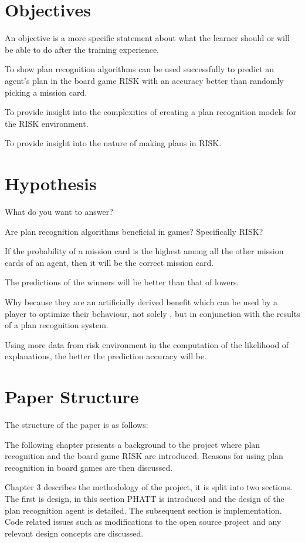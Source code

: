 \documentclass[parskip]{cs4rep}
\begin{document}
\section{Objectives}

An objective is a more specific statement about what the learner should or will be able to do after the training experience.

To show plan recognition algorithms can be used successfully to predict an agent's plan in the board game RISK with an accuracy better than randomly picking a mission card.

To provide insight into the complexities of creating a plan recognition models for the RISK environment.

To provide insight into the nature of making plans in RISK. 

\section{Hypothesis}

What do you want to answer?

Are plan recognition algorithms beneficial in games? Specifically RISK?

If the probability of a mission card is the highest among all the other mission cards of an agent, then it will be the correct mission card.

The predictions of the winners will be better than that of lowers.

Why because they are an artificially derived benefit which can be used by a player to optimize their behaviour, not solely , but in conjunction with the results of a plan recognition system.

Using more data from risk environment in the computation of the likelihood of explanations, the better the prediction accuracy will be.

\section{Paper Structure}

The structure of the paper is as follows:

The following chapter presents a background to the project where plan recognition and the board game RISK are introduced. Reasons for using plan recognition in board games are then discussed.

Chapter 3 describes the methodology of the project, it is split into two sections. The first is design, in this section PHATT is introduced and the design of the plan recognition agent is detailed. The subsequent section is implementation. Code related issues such as modifications to the open source project and any relevant design concepts are discussed. 
\end{document}
